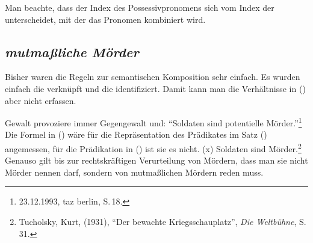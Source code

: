 Man beachte, dass der Index des Possessivpronomens sich vom Index der \nbar unterscheidet, mit der
das Pronomen kombiniert wird.

\subsection{\emph{mutmaßliche Mörder}}

Bisher waren die Regeln zur semantischen Komposition sehr einfach. Es wurden einfach die \relslen
verknüpft und die \ltopwe identifiziert. Damit kann man die Verhältnisse in () aber nicht erfassen.

\ea
\label{soldat}

Gewalt provoziere immer Gegengewalt und: "`Soldaten sind potentielle Mörder."'\footnote{
23.12.1993, taz berlin, S.\,18.
}
\z
Die Formel in () wäre für die Repräsentation des Prädikates im Satz () angemessen, für
die Prädikation in () ist sie es nicht.
\ea
{}(x)
\z
\ea
Soldaten sind Mörder.\footnote{
  Tucholsky, Kurt, (1931), "`Der bewachte Kriegsschauplatz"', \emph{Die Weltbühne}, S.\,31.
}
\z
Genauso gilt bis zur rechtskräftigen Verurteilung von Mördern, dass man sie nicht Mörder nennen
darf, sondern von mutmaßlichen Mördern reden muss. 

